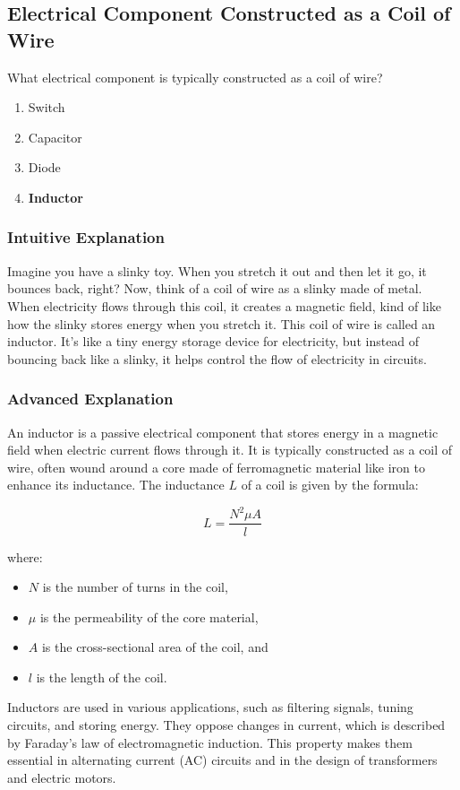 \subsection{Electrical Component Constructed as a Coil of Wire}
\label{T6A07}

\begin{tcolorbox}[colback=gray!10!white,colframe=black!75!black,title=T6A07]
What electrical component is typically constructed as a coil of wire?
\begin{enumerate}[label=\Alph*)]
    \item Switch
    \item Capacitor
    \item Diode
    \item \textbf{Inductor}
\end{enumerate}
\end{tcolorbox}

\subsubsection{Intuitive Explanation}
Imagine you have a slinky toy. When you stretch it out and then let it go, it bounces back, right? Now, think of a coil of wire as a slinky made of metal. When electricity flows through this coil, it creates a magnetic field, kind of like how the slinky stores energy when you stretch it. This coil of wire is called an inductor. It’s like a tiny energy storage device for electricity, but instead of bouncing back like a slinky, it helps control the flow of electricity in circuits.

\subsubsection{Advanced Explanation}
An inductor is a passive electrical component that stores energy in a magnetic field when electric current flows through it. It is typically constructed as a coil of wire, often wound around a core made of ferromagnetic material like iron to enhance its inductance. The inductance \( L \) of a coil is given by the formula:

\[
L = \frac{N^2 \mu A}{l}
\]

where:
\begin{itemize}
    \item \( N \) is the number of turns in the coil,
    \item \( \mu \) is the permeability of the core material,
    \item \( A \) is the cross-sectional area of the coil, and
    \item \( l \) is the length of the coil.
\end{itemize}

Inductors are used in various applications, such as filtering signals, tuning circuits, and storing energy. They oppose changes in current, which is described by Faraday's law of electromagnetic induction. This property makes them essential in alternating current (AC) circuits and in the design of transformers and electric motors.

